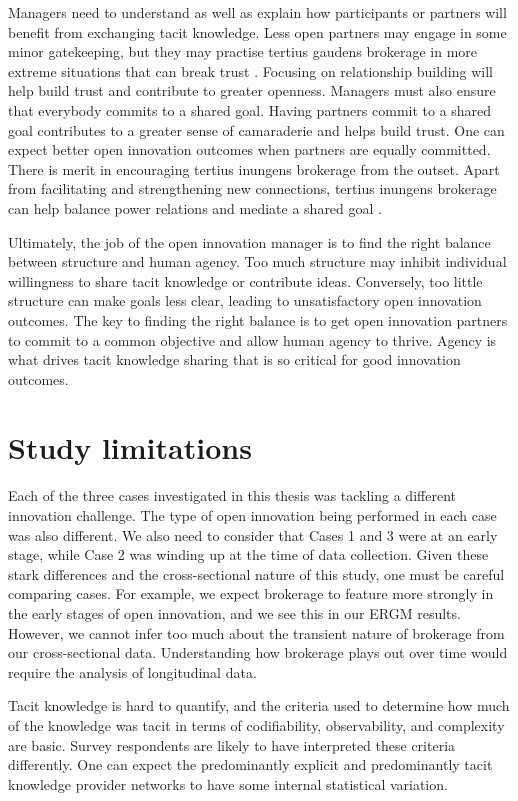 Managers need to understand as well as explain how participants or partners will benefit from exchanging tacit knowledge. Less open partners may engage in some minor gatekeeping, but they may practise tertius gaudens brokerage in more extreme situations that can break trust \citep{obstfeld2014brokerage}. Focusing on relationship building will help build trust and contribute to greater openness. Managers must also ensure that everybody commits to a shared goal. Having partners commit to a shared goal contributes to a greater sense of camaraderie and helps build trust. One can expect better open innovation outcomes when partners are equally committed. There is merit in encouraging tertius inungens brokerage from the outset. Apart from facilitating and strengthening new connections, tertius inungens brokerage can help balance power relations and mediate a shared goal \citep{chesbrough2012open}.\medskip

Ultimately, the job of the open innovation manager is to find the right balance between structure and human agency. Too much structure may inhibit individual willingness to share tacit knowledge or contribute ideas. Conversely, too little structure can make goals less clear, leading to unsatisfactory open innovation outcomes. The key to finding the right balance is to get open innovation partners to commit to a common objective and allow human agency to thrive. Agency is what drives tacit knowledge sharing that is so critical for good innovation outcomes.

 \section{Study limitations}
 
 Each of the three cases investigated in this thesis was tackling a different innovation challenge. The type of open innovation being performed in each case was also different. We also need to consider that Cases 1 and 3 were at an early stage, while Case 2 was winding up at the time of data collection. Given these stark differences and the cross-sectional nature of this study, one must be careful comparing cases. For example, we expect brokerage to feature more strongly in the early stages of open innovation, and we see this in our ERGM results. However, we cannot infer too much about the transient nature of brokerage from our cross-sectional data. Understanding how brokerage plays out over time would require the analysis of longitudinal data. \medskip

Tacit knowledge is hard to quantify, and the criteria used to determine how much of the knowledge was tacit in terms of codifiability, observability, and complexity are basic. Survey respondents are likely to have interpreted these criteria differently. One can expect the predominantly explicit and predominantly tacit knowledge provider networks to have some internal statistical variation. \medskip


